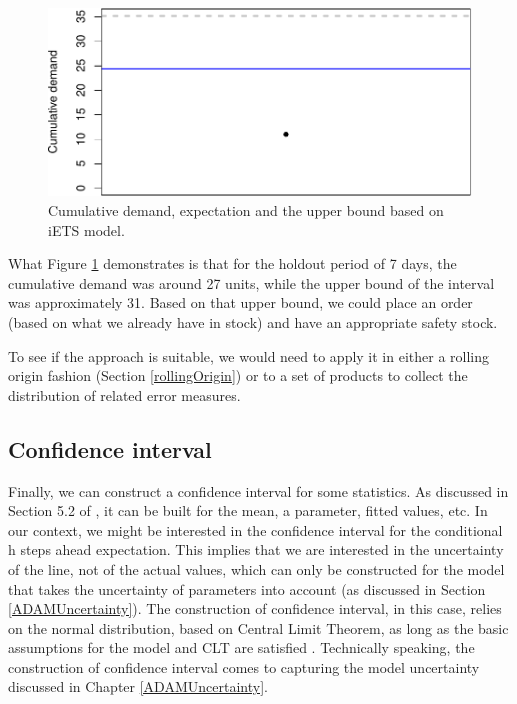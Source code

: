 \documentclass[
]{book}
\theoremstyle{definition}
\theoremstyle{definition}
\theoremstyle{definition}
\theoremstyle{definition}
\theoremstyle{remark}
\begin{document}
\begin{figure}
\centering
\includegraphics{Svetunkov--2022----ADAM_files/figure-latex/adamModeliETSCumulative-1.pdf}
\caption{\label{fig:adamModeliETSCumulative}Cumulative demand, expectation and the upper bound based on iETS model.}
\end{figure}

What Figure \ref{fig:adamModeliETSCumulative} demonstrates is that for the holdout period of 7 days, the cumulative demand was around 27 units, while the upper bound of the interval was approximately 31. Based on that upper bound, we could place an order (based on what we already have in stock) and have an appropriate safety stock.

To see if the approach is suitable, we would need to apply it in either a rolling origin fashion (Section \ref{rollingOrigin}) or to a set of products to collect the distribution of related error measures.

\hypertarget{confidence-interval}{%
\subsection{Confidence interval}\label{confidence-interval}}

Finally, we can construct a confidence interval for some statistics. As discussed in Section 5.2 of \citet{SvetunkovSBA}, it can be built for the mean, a parameter, fitted values, etc. In our context, we might be interested in the confidence interval for the conditional h steps ahead expectation. This implies that we are interested in the uncertainty of the line, not of the actual values, which can only be constructed for the model that takes the uncertainty of parameters into account (as discussed in Section \ref{ADAMUncertainty}). The construction of confidence interval, in this case, relies on the normal distribution, based on Central Limit Theorem, as long as the basic assumptions for the model and CLT are satisfied \citep[see Section 4.2 and Chapter 12 of][]{SvetunkovSBA}. Technically speaking, the construction of confidence interval comes to capturing the model uncertainty discussed in Chapter \ref{ADAMUncertainty}.
\end{document}

